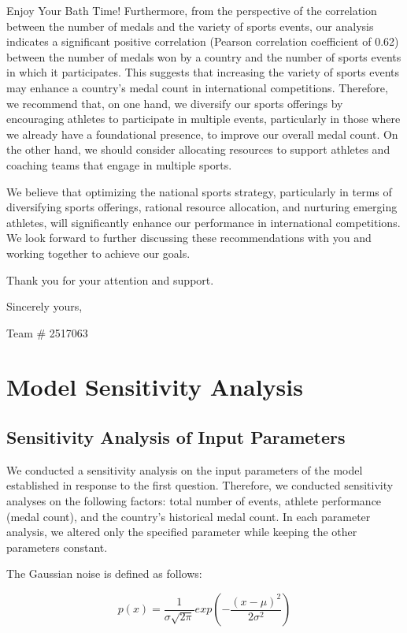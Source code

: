 \documentclass{mcmthesis}
\begin{document}
\begin{letter}{Enjoy Your Bath Time!}
Furthermore, from the perspective of the correlation between the number of medals and the variety of sports events, our analysis indicates a significant positive correlation (Pearson correlation coefficient of 0.62) between the number of medals won by a country and the number of sports events in which it participates. This suggests that increasing the variety of sports events may enhance a country's medal count in international competitions. Therefore, we recommend that, on one hand, we diversify our sports offerings by encouraging athletes to participate in multiple events, particularly in those where we already have a foundational presence, to improve our overall medal count. On the other hand, we should consider allocating resources to support athletes and coaching teams that engage in multiple sports.

We believe that optimizing the national sports strategy, particularly in terms of diversifying sports offerings, rational resource allocation, and nurturing emerging athletes, will significantly enhance our performance in international competitions. We look forward to further discussing these recommendations with you and working together to achieve our goals.

Thank you for your attention and support.

\vspace{\parskip}

Sincerely yours,

Team \# 2517063

\end{letter}

\section{Model Sensitivity Analysis}
\subsection{Sensitivity Analysis of Input Parameters}
We conducted a sensitivity analysis on the input parameters of the model established in response to the first question. Therefore, we conducted sensitivity analyses on the following factors: total number of events, athlete performance (medal count), and the country's historical medal count. In each parameter analysis, we altered only the specified parameter while keeping the other parameters constant.

The Gaussian noise is defined as follows:

\begin{equation}
p(x)=\frac{1}{\sigma \sqrt{2\pi}}exp(-\frac{(x-\mu)^{2}}{2\sigma ^{2}})
\end{equation}
\end{document}
